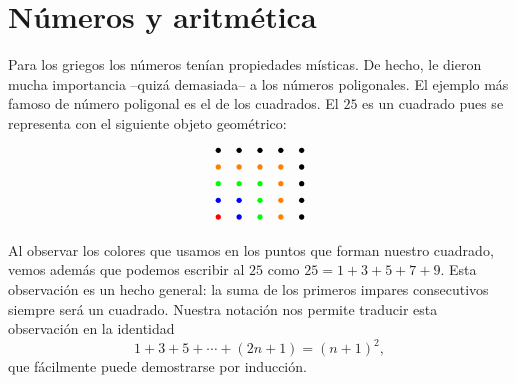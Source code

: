 \chapter{Números y aritmética}

Para los griegos los números tenían propiedades místicas. De hecho, le dieron
mucha importancia --quizá demasiada-- a los números poligonales.  El ejemplo
más famoso de número poligonal es el de los cuadrados. El $25$ es un cuadrado
pues se representa con el siguiente objeto geométrico:
\[
\begin{array}{ccccc}
	\bullet & \bullet & \bullet & \bullet & \bullet\\
	\textcolor{orange}{\bullet} & \textcolor{orange}{\bullet} & \textcolor{orange}{\bullet} & \textcolor{orange}{\bullet} & \bullet\\
	\textcolor{green}{\bullet} & \textcolor{green}{\bullet} & \textcolor{green}{\bullet} & \textcolor{orange}{\bullet} & \bullet\\
	\textcolor{blue}\bullet & \textcolor{blue}{\bullet} & \textcolor{green}{\bullet}     & \textcolor{orange}{\bullet} & \bullet\\
	\textcolor{red}{\bullet} & \textcolor{blue}{\bullet} & \textcolor{green}{\bullet}    & \textcolor{orange}{\bullet} & \bullet
\end{array}
\]

Al observar los colores que usamos en los puntos que forman nuestro cuadrado,
vemos además que podemos escribir al $25$ como $25=1+3+5+7+9$. Esta observación
es un hecho general: la suma de los primeros impares consecutivos siempre será
un cuadrado. Nuestra notación nos permite traducir esta observación en la
identidad 
\[
	1+3+5+\cdots+(2n+1)=(n+1)^2,
\]
que fácilmente puede demostrarse por inducción. 

